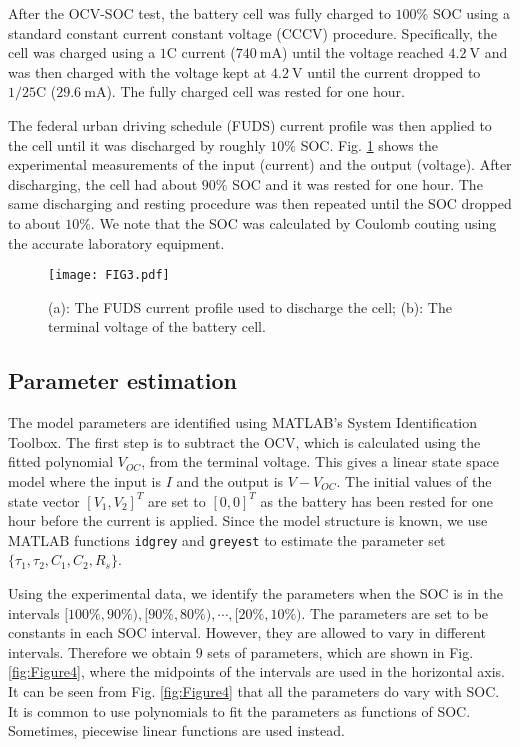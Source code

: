 \documentclass[letterpaper,twocolumn]{IEEEtran}
\begin{document}
After the OCV-SOC test, the battery cell was fully charged to $100\%$ SOC using a standard constant current constant voltage (CCCV) procedure. Specifically, the cell was charged using a $1$C current ($\SI{740} {\milli\ampere}$) until the voltage reached $\SI{4.2} {\volt}$ and was then charged with the voltage kept at $\SI{4.2} {\volt}$ until the current dropped to $1/25$C ($\SI{29.6} {\milli\ampere}$). The fully charged cell was rested for one hour.

The federal urban driving schedule (FUDS) current profile \cite{testmanual} was then applied to the cell until it was discharged by roughly $10\%$ SOC. Fig. \ref{fig:Figure3} shows the experimental measurements of the input (current) and the output (voltage). After discharging, the cell had about $90\%$ SOC and it was rested for one hour. The same discharging and resting procedure was then repeated until the SOC dropped to about $10\%$.  We note that the SOC was calculated by Coulomb couting using the accurate laboratory equipment.

\begin{figure}
\centering
\texttt{[image: FIG3.pdf]}
\caption{(a): The FUDS current profile used to discharge the cell; (b): The terminal voltage of the battery cell.}
\label{fig:Figure3}
\end{figure}

\subsection{Parameter estimation}
The model parameters are identified using MATLAB\textsuperscript {\circledR}'s System Identification Toolbox. The first step is to subtract the OCV, which is calculated using the fitted polynomial $V_{OC}$, from the terminal voltage. This gives a linear state space model where the input is $I$ and the output is $V-V_{OC}$. The initial values of the state vector $[V_1, V_2]^T$ are set to $[0,0]^T$ as the battery has been rested for one hour before the current is applied. Since the model structure is known, we use MATLAB functions \texttt{idgrey} and \texttt{greyest} to estimate the parameter set $\{\tau_1,\tau_2,C_1,C_2, R_s\}$.

Using the experimental data, we identify the parameters when the SOC is in the intervals $[100\%,90\%), [90\%,80\%),\cdots,[20\%,10\%)$. The parameters are set to be constants in each SOC interval. However, they are allowed to vary in different intervals. Therefore we obtain $9$ sets of parameters, which are shown in Fig. \ref{fig:Figure4}, where the midpoints of the intervals are used in the horizontal axis.
It can be seen from Fig. \ref{fig:Figure4} that all the parameters do vary with SOC. It is common to use polynomials to fit the parameters as functions of SOC. Sometimes, piecewise linear functions are used instead.
\end{document}

